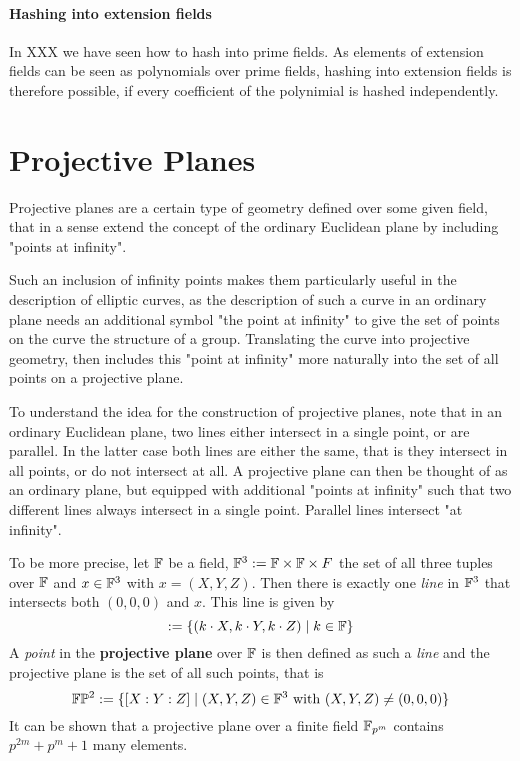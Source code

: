 \paragraph{Hashing into extension fields} In XXX we have seen how to hash into prime fields. As elements of extension fields can be seen as polynomials over prime fields, hashing into extension fields is therefore possible, if every coefficient of the polynimial is hashed independently. 
\section{Projective Planes}
Projective planes are a certain type of geometry defined over some given field, that in a sense extend the concept of the ordinary Euclidean plane by including "points at infinity".

Such an inclusion of infinity points makes them particularly useful in the description of elliptic curves, as the description of such a curve in an ordinary plane needs an additional symbol "the point at infinity" to give the set of points on the curve the structure of a group. Translating the curve into projective geometry, then includes this "point at infinity" more naturally into the set of all points on a projective plane.

To understand the idea for the construction of projective planes, note that in
an ordinary Euclidean plane, two lines either intersect in a single point, or are parallel. In the latter case both lines are either the same, that is they intersect in all points, or do not intersect at all. A projective plane can then be thought of as an ordinary plane, but equipped with additional "points at infinity" such that two different lines always intersect in a single point. Parallel lines intersect "at infinity".

To be more precise, let $\mathbb{F}$ be a field, $\mathbb{F}^3:=\mathbb{F}\times \mathbb{F}\times F$ the set of all three tuples over $\mathbb{F}$ and $x\in \mathbb{F}^3$ with $x=(X,Y,Z)$. Then there is exactly one \textit{line} in $\mathbb{F}^3$ that intersects both $(0,0,0)$ and $x$. This line is given by
\begin{equation}
[X:Y:Z] := \{(k\cdot X,k\cdot Y, k\cdot Z)\;|\; k\in\F\}
\end{equation}
A \textit{point} in the \textbf{projective plane} over $\mathbb{F}$ is then defined as such a \textit{line} and the projective plane is the set of all such points, that is
\begin{equation}
\mathbb{F}\mathbb{P}^2:=\{[X:Y:Z]\;|\; (X,Y,Z)\in \mathbb{F}^3\text{ with } (X,Y,Z)\neq (0,0,0)\}
\end{equation}
It can be shown that a projective plane over a finite field $\mathbb{F}_{p^m}$ contains $p^{2m}+p^m+1$ many elements.

